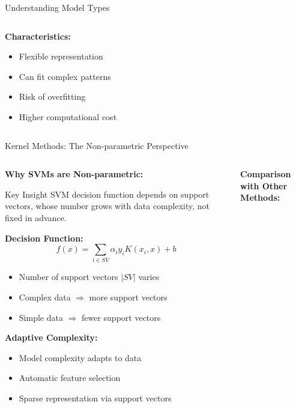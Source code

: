 \documentclass[8pt,aspectratio=1610]{beamer}
\begin{document}
\begin{frame}{Understanding Model Types}
\begin{columns}[t]
\begin{column}{0.48\textwidth}
\vspace{0.3cm}
\textbf{Characteristics:}
\begin{itemize}
\setlength{\itemsep}{1pt}
\item Flexible representation
\item Can fit complex patterns
\item Risk of overfitting
\item Higher computational cost
\end{itemize}
\end{column}
\end{columns}
\end{frame}

\begin{frame}{Kernel Methods: The Non-parametric Perspective}
\begin{columns}[t]
\begin{column}{0.48\textwidth}
\textbf{Why SVMs are Non-parametric:}
\vspace{0.3cm}

\begin{alertblock}{Key Insight}
SVM decision function depends on support vectors, whose number grows with data complexity, not fixed in advance.
\end{alertblock}

\vspace{0.3cm}
\textbf{Decision Function:}
$$f(x) = \sum_{i \in SV} \alpha_i y_i K(x_i, x) + b$$

\vspace{0.2cm}
\begin{itemize}
\setlength{\itemsep}{1pt}
\item Number of support vectors $|SV|$ varies
\item Complex data $\Rightarrow$ more support vectors
\item Simple data $\Rightarrow$ fewer support vectors
\end{itemize}

\vspace{0.3cm}
\textbf{Adaptive Complexity:}
\begin{itemize}
\setlength{\itemsep}{1pt}
\item Model complexity adapts to data
\item Automatic feature selection
\item Sparse representation via support vectors
\end{itemize}
\end{column}

\begin{column}{0.48\textwidth}
\textbf{Comparison with Other Methods:}
\vspace{0.3cm}


\end{column}
\end{columns}
\end{frame}
\end{document}
